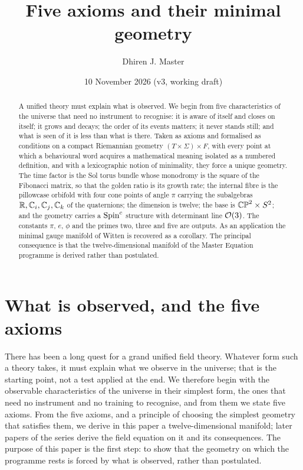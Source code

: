 \documentclass[11pt,a4paper]{article}
\title{Five axioms and their minimal geometry}
\author{Dhiren J. Master}
\date{10 November 2026 (v3, working draft)}
\theoremstyle{plain}
\theoremstyle{definition}
\theoremstyle{remark}
\begin{document}
\maketitle

\begin{abstract}
A unified theory must explain what is observed. We begin from five characteristics of the universe that need no instrument to recognise: it is aware of itself and closes on itself; it grows and decays; the order of its events matters; it never stands still; and what is seen of it is less than what is there. Taken as axioms and formalised as conditions on a compact Riemannian geometry $(T\times\Sigma)\times F$, with every point at which a behavioural word acquires a mathematical meaning isolated as a numbered definition, and with a lexicographic notion of minimality, they force a unique geometry. The time factor is the Sol torus bundle whose monodromy is the square of the Fibonacci matrix, so that the golden ratio is its growth rate; the internal fibre is the pillowcase orbifold with four cone points of angle $\pi$ carrying the subalgebras $\mathbb{R},\mathbb{C}_i,\mathbb{C}_j,\mathbb{C}_k$ of the quaternions; the dimension is twelve; the base is $\mathbb{CP}^2\times S^2$; and the geometry carries a $\text{Spin}^c$ structure with determinant line $\mathcal{O}(3)$. The constants $\pi$, $e$, $\phi$ and the primes two, three and five are outputs. As an application the minimal gauge manifold of Witten is recovered as a corollary. The principal consequence is that the twelve-dimensional manifold of the Master Equation programme is derived rather than postulated.
\end{abstract}

\section{What is observed, and the five axioms}\label{sec:intro}

There has been a long quest for a grand unified field theory. Whatever form such a theory takes, it must explain what we observe in the universe; that is the starting point, not a test applied at the end. We therefore begin with the observable characteristics of the universe in their simplest form, the ones that need no instrument and no training to recognise, and from them we state five axioms. From the five axioms, and a principle of choosing the simplest geometry that satisfies them, we derive in this paper a twelve-dimensional manifold; later papers of the series derive the field equation on it and its consequences. The purpose of this paper is the first step: to show that the geometry on which the programme rests is forced by what is observed, rather than postulated.
\end{document}
